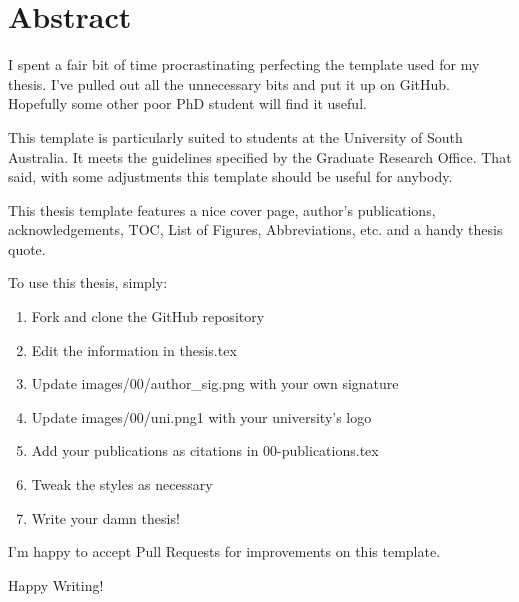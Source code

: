 

\newpage
\thispagestyle{plain}
\chapter*{Abstract}
I spent a fair bit of time procrastinating perfecting the template used for my
thesis. I've pulled out all the unnecessary bits and put it up on GitHub.
Hopefully some other poor PhD student will find it useful.

This template is particularly suited to students at the University of South
Australia. It meets the guidelines specified by the Graduate Research Office.
That said, with some adjustments this template should be useful for anybody.

This thesis template features a nice cover page, author's publications,
acknowledgements, TOC, List of Figures, Abbreviations, etc. and a handy thesis
quote.

To use this thesis, simply:

\begin{enumerate}
    \item Fork and clone the GitHub repository
    \item Edit the information in thesis.tex
    \item Update images/00/author\_sig.png with your own signature
    \item Update images/00/uni.png1 with your university's logo
    \item Add your publications as citations in 00-publications.tex
    \item Tweak the styles as necessary
    \item Write your damn thesis!
\end{enumerate}

I'm happy to accept Pull Requests for improvements on this template.

Happy Writing!

\clearpage

